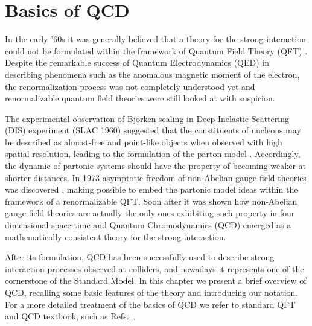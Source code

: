 \chapter{Basics of QCD}
In the early '60s it was generally believed that a theory for the strong interaction could not be formulated
within the framework of Quantum Field Theory (QFT) \cite{tHooft:1998qmr}.
Despite the remarkable success of Quantum Electrodynamics (QED) in describing phenomena such as the anomalous magnetic moment of the electron,
the renormalization process was not completely understood yet and 
renormalizable quantum field theories were still looked at with suspicion.
 
%
The experimental observation of Bjorken scaling \cite{PhysRev.179.1547} in Deep Inelastic Scattering (DIS) experiment (SLAC 1960)
suggested that the constituents of nucleons may be described as almost-free and point-like objects 
when observed with high spatial resolution, leading to the formulation of the parton model \cite{PhysRevLett.23.1415}.
Accordingly, the dynamic of  partonic systems should have the property of becoming weaker at shorter distances. 
In 1973 asymptotic freedom of non-Abelian gauge field theories was discovered \cite{PhysRevLett.30.1346, PhysRevLett.30.1343},
making possible to embed the partonic model ideas within the framework of a renormalizable QFT.
%
Soon after it was shown how non-Abelian gauge field theories are actually the only ones exhibiting such property
in four dimensional space-time \cite{PhysRevLett.31.851} and Quantum Chromodynamics (QCD) emerged as a mathematically 
consistent theory for the strong interaction.  

%
After its formulation, QCD has been successfully used to describe strong interaction processes observed at colliders, and
nowadays it represents one of the cornerstone of the Standard Model. In this chapter we present
a brief overview of QCD, recalling some basic features of the theory and introducing our notation. 
For a more detailed treatment of the basics of QCD we refer to standard QFT and QCD textbook, such
as Refs.~\cite{Ellis:1991qj,Muta:2010xua,Collins:1984xc}.


